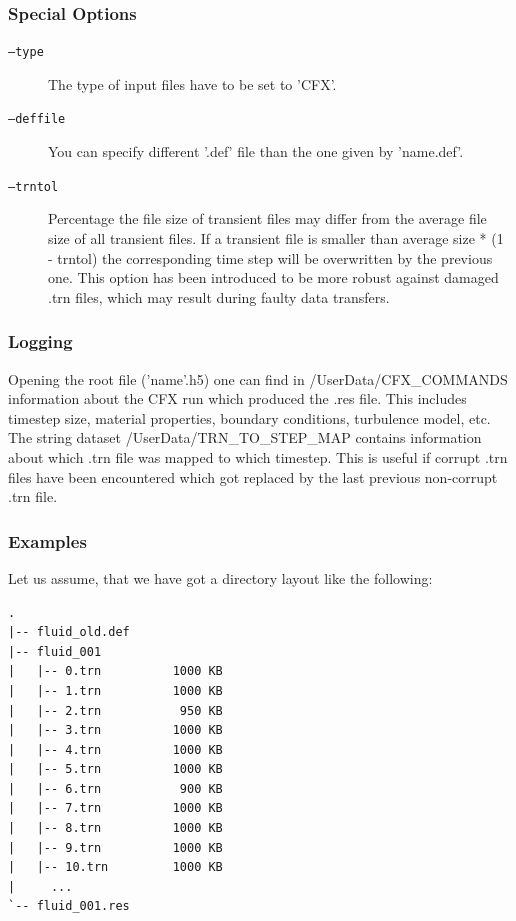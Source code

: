 \documentclass[a4paper,10pt]{article}
\begin{document}
\subsubsection{Special Options}

\begin{description}
  \item[{\tt --type}] The type of input files have to be set to 'CFX'.

  \item[{\tt --deffile}]  You can specify  different '.def' file than  the one
    given by 'name.def'.

  \item[{\tt --trntol}] Percentage the file size of transient files may differ
    from the average file size of  all transient files. If a transient file is
    smaller than average size * (1  - trntol) the corresponding time step will
    be overwritten by the previous one.  This option has been introduced to be
    more robust  against damaged  .trn files, which  may result  during faulty
    data transfers.
\end{description}


\subsubsection{Logging}

Opening the root \hdf file ('name'.h5) one can find in /UserData/CFX\_COMMANDS
information about  the CFX  run which produced  the .res file.   This includes
timestep  size, material  properties, boundary  conditions,  turbulence model,
etc.   The string  dataset  /UserData/TRN\_TO\_STEP\_MAP contains  information
about which .trn file was mapped  to which timestep. This is useful if corrupt
.trn  files have  been encountered  which got  replaced by  the  last previous
non-corrupt .trn file.

\subsubsection{Examples}

Let us assume, that we have got a directory layout like the following:

\begin{verbatim}
.
|-- fluid_old.def
|-- fluid_001
|   |-- 0.trn          1000 KB
|   |-- 1.trn          1000 KB
|   |-- 2.trn           950 KB
|   |-- 3.trn          1000 KB
|   |-- 4.trn          1000 KB
|   |-- 5.trn          1000 KB
|   |-- 6.trn           900 KB
|   |-- 7.trn          1000 KB
|   |-- 8.trn          1000 KB
|   |-- 9.trn          1000 KB
|   |-- 10.trn         1000 KB
|     ...
`-- fluid_001.res
\end{verbatim}
\end{document}
